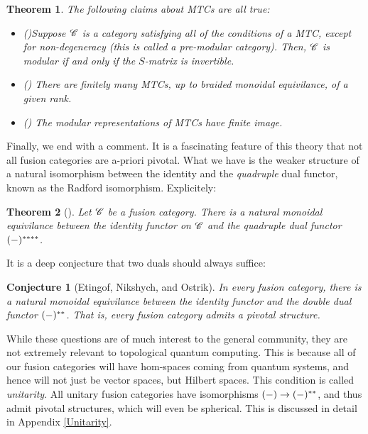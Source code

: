 \documentclass{article}
\newtheorem{theorem}{Theorem}[section]
\newtheorem{conjecture}{Conjecture}[section]
\theoremstyle{definition}
\numberwithin{figure}{section}
\begin{document}
\begin{enumerate}[\thesection .1.]
\begin{theorem} The following claims about MTCs are all true:

\begin{itemize}
\item (\cite{bruguieres2000categories})Suppose $\mathscr{C}$ is a category satisfying all of the conditions of a MTC, except for non-degeneracy (this is called a pre-modular category). Then, $\mathscr{C}$ is modular if and only if the $S$-matrix is invertible.
\item (\cite{bruillard2016rank}) There are finitely many MTCs, up to braided monoidal equivilance, of a given rank.
\item (\cite{ng2010congruence}) The modular representations of MTCs have finite image.
\end{itemize}
\end{theorem}

Finally, we end with a comment. It is a fascinating feature of this theory that not all fusion categories are a-priori pivotal. What we have is the weaker structure of a natural isomorphism between the identity and the \textit{quadruple} dual functor, known as the Radford isomorphism. Explicitely:

\begin{theorem}[\cite{etingof2005fusion}] Let $\mathscr{C}$ be a fusion category. There is a natural monoidal equivilance between the identity functor on $\mathscr{C}$ and the quadruple dual functor $(\--)^{****}$.
\end{theorem}

It is a deep conjecture that two duals should always suffice:

\begin{conjecture}[Etingof, Nikshych, and Ostrik] In every fusion category, there is a natural monoidal equivilance between the identity functor and the double dual functor $(\--)^{**}$. That is, every fusion category admits a pivotal structure.
\end{conjecture}

While these questions are of much interest to the general community, they are not extremely relevant to topological quantum computing. This is because all of our fusion categories will have hom-spaces coming from quantum systems, and hence will not just be vector spaces, but Hilbert spaces. This condition is called \textit{unitarity}. All unitary fusion categories have isomorphisms $(\--)\to (\--)^{**}$, and thus admit pivotal structures, which will even be spherical. This is discussed in detail in Appendix \ref{Unitarity}.


\end{enumerate}
\end{document}
